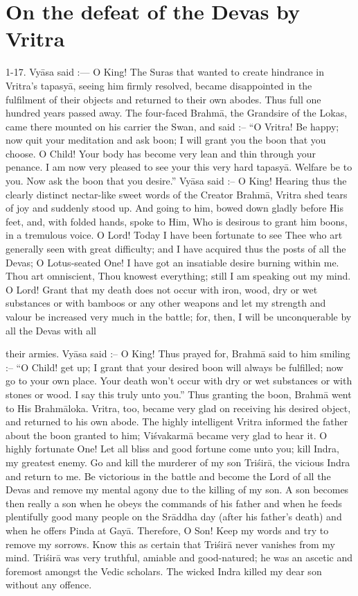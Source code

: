 \chapter{On the defeat of the Devas by Vritra}

1-17. Vy\=asa said :--- O King! The Suras that wanted to create hindrance in Vritra's tapasy\=a, seeing him firmly resolved, became disappointed in the fulfilment of their objects and returned to their own abodes. Thus full one hundred years passed away. The four-faced Brahm\=a, the Grandsire of the Lokas, came there mounted on his carrier the Swan, and said :-- ``O Vritra! Be happy; now quit your meditation and ask boon; I will grant you the boon that you choose. O Child! Your body has become very lean and thin through your penance. I am now very pleased to see your this very hard tapasy\=a. Welfare be to you. Now ask the boon that you desire.'' Vy\=asa said :-- O King! Hearing thus the clearly distinct nectar-like sweet words of the Creator Brahm\=a, Vritra shed tears of joy and suddenly stood up. And going to him, bowed down gladly before His feet, and, with folded hands, spoke to Him, Who is desirous to grant him boons, in a tremulous voice. O Lord! Today I have been fortunate to see Thee who art generally seen with great difficulty; and I have acquired thus the posts of all the Devas; O Lotus-seated One! I have got an insatiable desire burning within me. Thou art omniscient, Thou knowest everything; still I am speaking out my mind. O Lord! Grant that my death does not occur with iron, wood, dry or wet substances or with bamboos or any other weapons and let my strength and valour be increased very much in the battle; for, then, I will be unconquerable by all the Devas with all

their armies. Vy\=asa said :-- O King! Thus prayed for, Brahm\=a said to him smiling :-- ``O Child! get up; I grant that your desired boon will always be fulfilled; now go to your own place. Your death won't occur with dry or wet substances or with stones or wood. I say this truly unto you.'' Thus granting the boon, Brahm\=a went to His Brahm\=aloka. Vritra, too, became very glad on receiving his desired object, and returned to his own abode. The highly intelligent Vritra informed the father about the boon granted to him; Vi\'svakarm\=a became very glad to hear it. O highly fortunate One! Let all bliss and good fortune come unto you; kill Indra, my greatest enemy. Go and kill the murderer of my son Tri\'sir\=a, the vicious Indra and return to me. Be victorious in the battle and become the Lord of all the Devas and remove my mental agony due to the killing of my son. A son becomes then really a son when he obeys the commands of his father and when he feeds plentifully good many people on the Sr\=addha day (after his father's death) and when he offers Pinda at Gay\=a. Therefore, O Son! Keep my words and try to remove my sorrows. Know this as certain that Tri\'sir\=a never vanishes from my mind. Tri\'sir\=a was very truthful, amiable and good-natured; he was an ascetic and foremost amongst the Vedic scholars. The wicked Indra killed my dear son without any offence.

